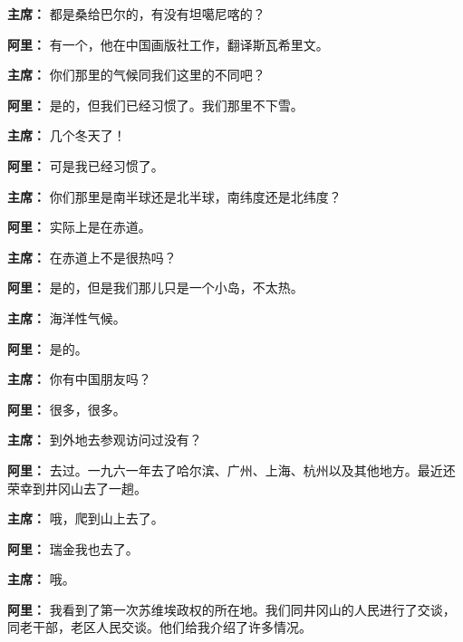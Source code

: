 \begin{list}{}
\item[\textbf{主席：}] 都是桑给巴尔的，有没有坦噶尼喀的？

\item[\textbf{阿里：}] 有一个，他在中国画版社工作，翻译斯瓦希里文。

\item[\textbf{主席：}] 你们那里的气候同我们这里的不同吧？

\item[\textbf{阿里：}] 是的，但我们已经习惯了。我们那里不下雪。

\item[\textbf{主席：}] 几个冬天了！

\item[\textbf{阿里：}] 可是我已经习惯了。

\item[\textbf{主席：}] 你们那里是南半球还是北半球，南纬度还是北纬度？

\item[\textbf{阿里：}] 实际上是在赤道。

\item[\textbf{主席：}] 在赤道上不是很热吗？

\item[\textbf{阿里：}] 是的，但是我们那儿只是一个小岛，不太热。

\item[\textbf{主席：}] 海洋性气候。

\item[\textbf{阿里：}] 是的。

\item[\textbf{主席：}] 你有中国朋友吗？

\item[\textbf{阿里：}] 很多，很多。

\item[\textbf{主席：}] 到外地去参观访问过没有？

\item[\textbf{阿里：}] 去过。一九六一年去了哈尔滨、广州、上海、杭州以及其他地方。最近还荣幸到井冈山去了一趟。

\item[\textbf{主席：}] 哦，爬到山上去了。

\item[\textbf{阿里：}] 瑞金我也去了。

\item[\textbf{主席：}] 哦。

\item[\textbf{阿里：}] 我看到了第一次苏维埃政权的所在地。我们同井冈山的人民进行了交谈，同老干部，老区人民交谈。他们给我介绍了许多情况。


\end{list}
